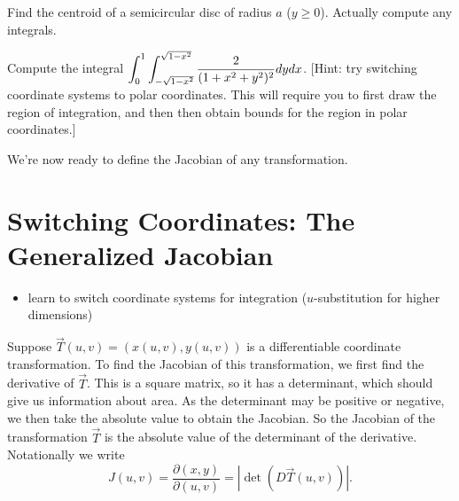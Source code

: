 \begin{problem}
Find the centroid of a semicircular disc of radius $a$ ($y\geq 0$). Actually compute any integrals.  


\end{problem}

\begin{problem}
Compute the integral $\displaystyle \int_{0}^{1}\int_{-\sqrt{1-x^2}}^{\sqrt{1-x^2}} \frac{2}{(1+x^2+y^2)^2}dydx$. [Hint: try switching coordinate systems to polar coordinates.  This will require you to first draw the region of integration, and then then obtain bounds for the region in polar coordinates.]
\end{problem}



We're now ready to define the Jacobian of any transformation.

\uday
\normalsize
\section{Switching Coordinates: The Generalized Jacobian}

\begin{itemize}
\item learn to switch coordinate systems for integration ($u$-substitution for higher dimensions)
\end{itemize}

\vskip0.2cm

\begin{definition}
 Suppose $\vec T(u,v)=(x(u,v),y(u,v))$ is a differentiable coordinate transformation. To find the Jacobian of this transformation, we first find the derivative of $\vec T$.  This is a square matrix, so it has a determinant, which should give us information about area. As the determinant may be positive or negative, we then take the absolute value to obtain the Jacobian.  So the Jacobian of the transformation $\vec T$ is the absolute value of the determinant of the derivative. 
 Notationally we write 
$$J(u,v) = \frac{\partial (x,y)}{\partial (u,v)} = |\det(D\vec T(u,v))|.$$
\end{definition}


